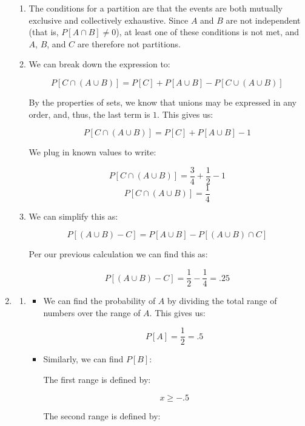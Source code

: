 \begin{enumerate}
\begin{enumerate}
      \item The conditions for a partition are that the events are both mutually exclusive and collectively exhaustive. Since $A$ and $B$ are not independent (that is, $P[A\cap B]\neq 0$), at least one of these conditions is not met, and $A$, $B$, and $C$ are therefore not partitions.

      \item We can break down the expression to:

        $$P[C\cap (A\cup B)]= P[C]+P[A\cup B]-P[C\cup (A\cup B)]$$

        By the properties of sets, we know that unions may be expressed in any order, and, thus, the last term is $1$. This gives us:

        $$P[C\cap (A\cup B)]= P[C]+P[A\cup B]-1$$

        We plug in known values to write:

        $$P[C\cap (A\cup B)]= \frac{3}{4}+\frac{1}{2}-1$$
        $$\boxed{P[C\cap (A\cup B)]= \frac{1}{4}}$$

      \item We can simplify this as:

        $$P[(A\cup B)-C]=P[A\cup B]-P[(A\cup B)\cap C]$$

        Per our previous calculation we can find this as:

        $$\boxed{P[(A\cup B)-C]=\frac{1}{2}-\frac{1}{4}=.25}$$

    \end{enumerate}

  \item 

    \begin{enumerate}

      \item 

        \begin{itemize}

          \item We can find the probability of $A$ by dividing the total range of numbers over the range of $A$. This gives us:

            $$\boxed{P[A]=\frac{1}{2}=.5}$$

          \item Similarly, we can find $P[B]$:

            The first range is defined by:

            $$x\geq -.5$$

            The second range is defined by:


\end{itemize}
\end{enumerate}
\end{enumerate}
